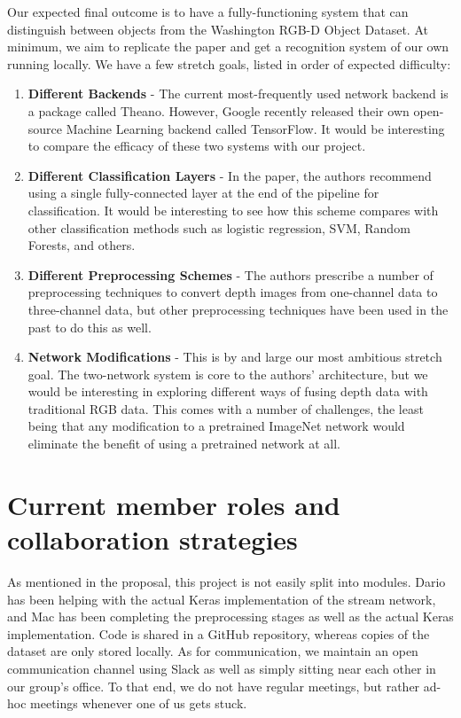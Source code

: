 \documentclass[paper=letter, fontsize=12pt]{article}
\begin{document}
Our expected final outcome is to have a fully-functioning system that can
distinguish between objects from the Washington RGB-D Object Dataset. At
minimum, we aim to replicate the paper and get a recognition system of our own
running locally. We have a few stretch goals, listed in order of expected
difficulty:

\begin{enumerate}

    \item \textbf{Different Backends} - The current most-frequently used
    network backend is a package called Theano. However, Google recently
    released their own open-source Machine Learning backend called
    TensorFlow. It would be interesting to compare the efficacy of these two
    systems with our project.

    \item \textbf{Different Classification Layers} - In the paper, the authors
    recommend using a single fully-connected layer at the end of the pipeline
    for classification. It would be interesting to see how this scheme
    compares with other classification methods such as logistic regression,
    SVM, Random Forests, and others.

    \item \textbf{Different Preprocessing Schemes} - The authors prescribe a
    number of preprocessing techniques to convert depth images from one-channel
    data to three-channel data, but other preprocessing techniques have been
    used in the past to do this as well.

    \item \textbf{Network Modifications} - This is by and large our most
    ambitious stretch goal. The two-network system is core to the authors'
    architecture, but we would be interesting in exploring different ways of
    fusing depth data with traditional RGB data. This comes with a number of
    challenges, the least being that any modification to a pretrained ImageNet
    network would eliminate the benefit of using a pretrained network at all.

\end{enumerate}


\section{Current member roles and collaboration strategies}

As mentioned in the proposal, this project is not easily split into modules.
Dario has been helping with the actual Keras implementation of the stream
network, and Mac has been completing the preprocessing stages as well as the
actual Keras implementation. Code is shared in a GitHub repository, whereas
copies of the dataset are only stored locally. As for communication, we maintain
an open communication channel using Slack as well as simply sitting near each
other in our group's office. To that end, we do not have regular meetings, but
rather ad-hoc meetings whenever one of us gets stuck.
\end{document}
